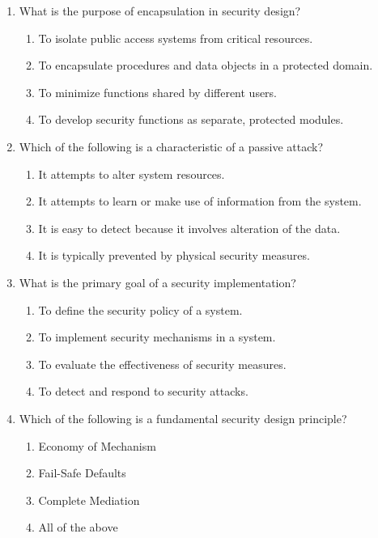 \documentclass{article}
\begin{document}
\begin{enumerate}
    \item What is the purpose of encapsulation in security design?
    \begin{enumerate}
        \item To isolate public access systems from critical resources.
        \item To encapsulate procedures and data objects in a protected domain.
        \item To minimize functions shared by different users.
        \item To develop security functions as separate, protected modules.
    \end{enumerate}
    
    \item Which of the following is a characteristic of a passive attack?
    \begin{enumerate}
        \item It attempts to alter system resources.
        \item It attempts to learn or make use of information from the system.
        \item It is easy to detect because it involves alteration of the data.
        \item It is typically prevented by physical security measures.
    \end{enumerate}
    \newpage
    \item What is the primary goal of a security implementation?
    \begin{enumerate}
        \item To define the security policy of a system.
        \item To implement security mechanisms in a system.
        \item To evaluate the effectiveness of security measures.
        \item To detect and respond to security attacks.
    \end{enumerate}
    
    \item Which of the following is a fundamental security design principle?
    \begin{enumerate}
        \item Economy of Mechanism
        \item Fail-Safe Defaults
        \item Complete Mediation
        \item All of the above
    \end{enumerate}
    

\end{enumerate}
\end{document}
